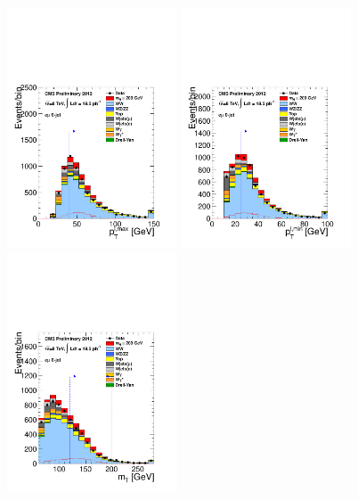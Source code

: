 \begin{figure}[htp]
\centering
\includegraphics[width=0.45\textwidth]{figures/hww_analysis16_200_ALL_of_0j_pt1.pdf}
\includegraphics[width=0.45\textwidth]{figures/hww_analysis16_200_ALL_of_0j_pt2.pdf}
\includegraphics[width=0.45\textwidth]{figures/hww_analysis16_200_ALL_of_0j_mt.pdf}

\end{figure}
